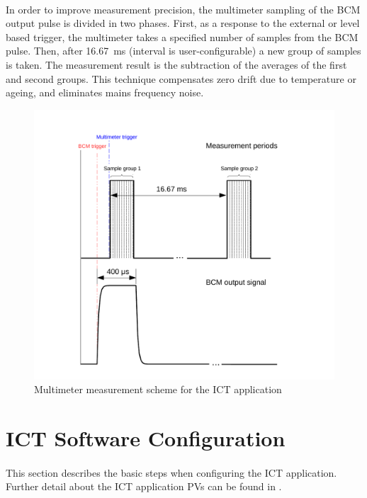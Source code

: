 \documentclass[openany]{article}
\begin{document}
	\paragraph{} In order to improve measurement precision, the multimeter sampling of the BCM output pulse is divided in two phases. First, as a response to the external or level based trigger, the multimeter takes a specified number of samples from the BCM pulse. Then, after \SI{16.67}{\milli\second} (interval is user-configurable) a new group of samples is taken. The measurement result is the subtraction of the averages of the first and second groups. This technique compensates zero drift due to temperature or ageing, and eliminates mains frequency noise.

	\begin{figure}[!h]
		\caption{Multimeter measurement scheme for the ICT application}
		\label{fig:meas-scheme}
		\centering
		\includegraphics[width=1.0\textwidth]{ict-meas-scheme-image}
	\end{figure}
\FloatBarrier

\section{ICT Software Configuration}

	\paragraph{} This section describes the basic steps when configuring the ICT application. Further detail about the ICT application PVs can be found in \emph{}.
\end{document}
